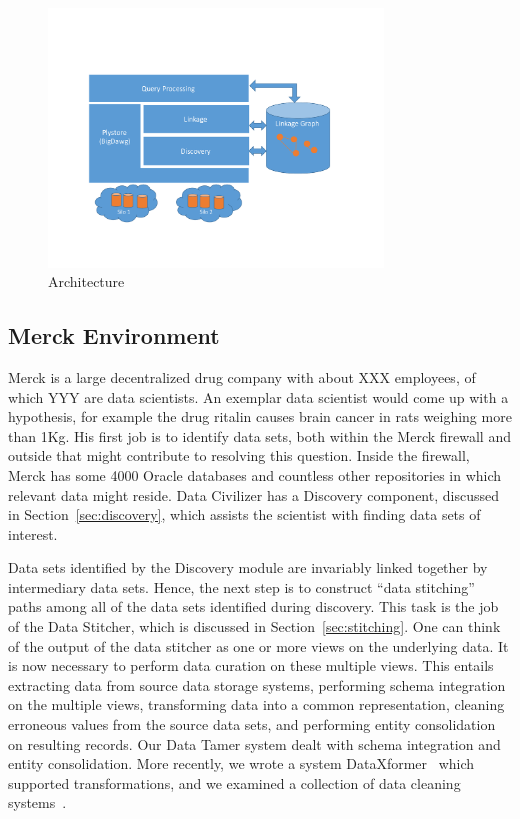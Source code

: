 \begin{figure}
\includegraphics[width=3.5in]{arch.pdf}
\caption{\dcv Architecture}
\label{fig:arch}
\end{figure}

    

\subsection{Merck Environment}

Merck is a large decentralized drug company with about XXX employees, of which
YYY are data scientists.  An exemplar data scientist would come up with a
hypothesis, for example the drug ritalin causes brain cancer in rats weighing
more than 1Kg.  His first job is to identify data sets, both within the Merck
firewall and outside that might contribute to resolving this question.  Inside
the firewall, Merck has some 4000 Oracle databases and countless other
repositories in which relevant data might reside.  Data Civilizer has a
Discovery component, discussed in Section~\ref{sec:discovery}, 
which assists the scientist with finding data sets of interest.

Data sets identified by the Discovery module are invariably linked together by
intermediary data sets.  Hence, the next step is to construct ``data stitching''
paths among all of the data sets identified during discovery.  This task is the
job of the Data Stitcher, which is discussed in Section~\ref{sec:stitching}. One can think of the
output of the data stitcher as one or more views on the underlying data. It is
now necessary to perform data curation on these multiple views.  This entails
extracting data from source data storage systems, performing schema integration
on the multiple views, transforming data into a common representation, cleaning
erroneous values from the source data sets, and performing entity consolidation
on resulting records.  Our Data Tamer system\cite{DBLP:conf/cidr/StonebrakerBIBCZPX13} dealt with schema integration
and entity consolidation.  More recently, we wrote a system DataXformer~\cite{DBLP:conf/icde/AbedjanMIOPS16}
which supported transformations, and we examined a collection of data cleaning
systems~\cite{evaluatioin}.

